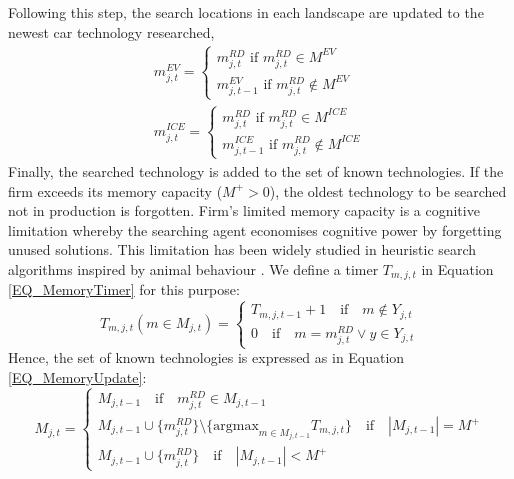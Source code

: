 \documentclass[12pt]{article}
\begin{document}
	Following this step, the search locations in each landscape are updated to the newest car technology researched,
	\begin{equation}
		\begin{aligned}
			m^{EV}_{j,t} = \begin{cases}
				m^{RD}_{j,t}\text{ if } m^{RD}_{j,t} \in M^{EV} \\
				m^{EV}_{j,t-1}\text{ if }m^{RD}_{j,t} \notin M^{EV}
			\end{cases} \\
			m^{ICE}_{j,t} = \begin{cases}
				m^{RD}_{j,t}\text{ if } m^{RD}_{j,t} \in M^{ICE} \\
				m^{ICE}_{j,t-1}\text{ if }m^{RD}_{j,t} \notin M^{ICE}
			\end{cases}
		\end{aligned}
		\label{EQ_SearchLocations}
	\end{equation}
	Finally, the searched technology is added to the set of known technologies. If the firm exceeds its memory capacity ($M^+>0$), the oldest technology to be searched not in production is forgotten. Firm's limited memory capacity is a cognitive limitation whereby the searching agent economises cognitive power by forgetting unused solutions. This limitation has been widely studied in heuristic search algorithms inspired by animal behaviour \citep{Tang_2012}. We define a timer $T_{m,j,t}$ in Equation \ref{EQ_MemoryTimer} for this purpose:
	\begin{equation}
		T_{m,j,t}(m\in{M_{j,t}}) = \begin{cases}
			T_{m,j,t-1} + 1\quad\text{if}\quad{m\notin{Y_{j,t}}}\\
			0\quad\text{if}\quad{m=m^{RD}_{j,t}\vee{y\in{Y_{j,t}}}}
		\end{cases}
		\label{EQ_MemoryTimer}
	\end{equation}
	Hence, the set of known technologies is expressed as in Equation \ref{EQ_MemoryUpdate}:
	\begin{equation}
		M_{j,t}=\begin{cases}
			M_{j,t-1}\quad\text{if}\quad m^{RD}_{j,t}\in  M_{j,t-1}\\
			M_{j,t-1}\cup\{m^{RD}_{j,t}\}\setminus\{\text{argmax}_{m\in{M_{j,t-1}}} T_{m,j,t}\}\quad\text{if}\quad|M_{j,t-1}|=M^+\\
			M_{j,t-1}\cup\{m^{RD}_{j,t}\}\quad\text{if}\quad|M_{j,t-1}|<M^+
		\end{cases}
		\label{EQ_MemoryUpdate}
	\end{equation}
\end{document}
